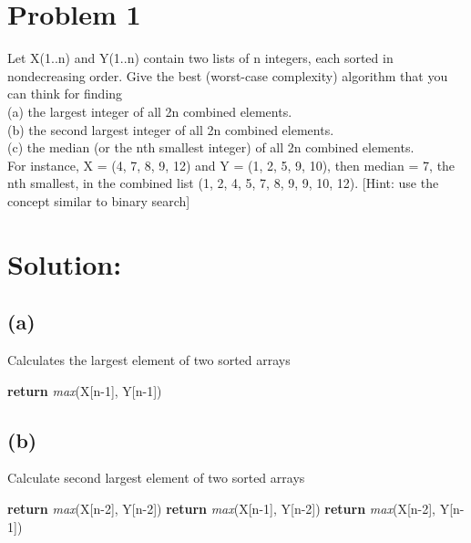 	\newdimen\boxitspace\boxitspace=3pt%
	\long\def\boxit#1{\vbox{\hrule\hbox{\vrule\kern\boxitspace\vbox{%
					\kern\boxitspace\parindent0pt#1\kern\boxitspace}%
				\kern\boxitspace\vrule}\hrule}}
	\def\aryitem#1{\boxit{\hbox to 1.4em{\hfil#1\hfil}}}%
	\let\MS\multispan%

    \section*{Problem 1}
    \noindent
    Let X(1..n) and Y(1..n) contain two lists of n integers, each sorted in nondecreasing order. Give the best (worst-case complexity) algorithm that you can think for finding \\
    (a) the largest integer of all 2n combined elements.\\
    (b) the second largest integer of all 2n combined elements.\\
    (c) the median (or the nth smallest integer) of all 2n combined elements.\\
    For instance, X = (4, 7, 8, 9, 12) and Y = (1, 2, 5, 9, 10), then median = 7, the nth smallest, in the combined list (1, 2, 4, 5, 7, 8, 9, 9, 10, 12). [Hint: use the concept similar to binary search]

    \section*{Solution:}
    	\subsection*{(a)}
  				\begin{algorithm}[H]
  					\caption{Calculates the largest element of two sorted arrays}
  					\begin{algorithmic}[1]
  						\State \textbf{return} \textit{max}(X[n-1], Y[n-1])
  						\EndProcedure
  					\end{algorithmic}
  				\end{algorithm}
  		\subsection*{(b)}
  			\begin{algorithm}[H]
  				\caption{Calculate second largest element of two sorted arrays}
  				\begin{algorithmic}[1]
  					\State\textbf{return} \textit{max}(X[n-2], Y[n-2])
  					\State\textbf{return} \textit{max}(X[n-1], Y[n-2])
  					\Else
  					\State\textbf{return} \textit{max}(X[n-2], Y[n-1])
  					\EndIf
  					\EndProcedure
  					
  				\end{algorithmic}
  			\end{algorithm}	
